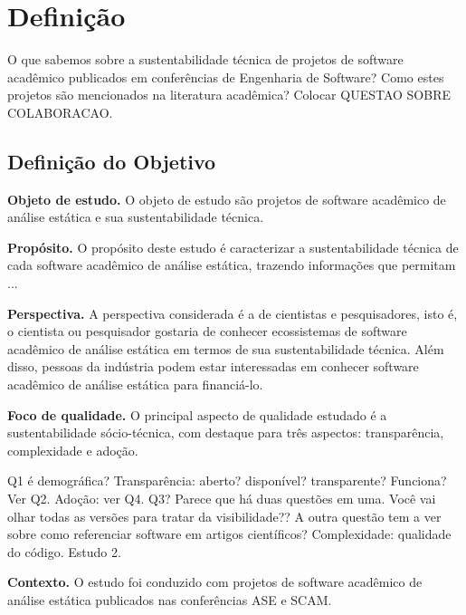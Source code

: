 

\section{Definição} \label{sec:study1:definition}


O que sabemos sobre a sustentabilidade técnica de projetos de software acadêmico publicados em conferências
de Engenharia de Software? Como estes projetos são mencionados na literatura acadêmica?   
Colocar QUESTAO SOBRE COLABORACAO.


\subsection{Definição do Objetivo}

\begin{description}
\item{\bf Objeto de estudo.} 
O objeto de estudo são projetos de software acadêmico de análise estática e sua sustentabilidade técnica.

\item{\bf Propósito.} 
O propósito deste estudo é caracterizar a sustentabilidade técnica de cada software acadêmico de análise estática,
trazendo informações que permitam ...

\item{\bf Perspectiva.} 
A perspectiva considerada é a de cientistas e pesquisadores, isto é, 
o cientista ou pesquisador gostaria de conhecer ecossistemas de software acadêmico de análise estática
em termos de sua sustentabilidade técnica. 
Além disso, pessoas da indústria podem estar interessadas em conhecer
software acadêmico de análise estática para financiá-lo.

\item{\bf Foco de qualidade.} 
O principal aspecto de qualidade estudado é a sustentabilidade sócio-técnica,
com destaque para três aspectos: transparência, complexidade e adoção.


Q1 é demográfica?
Transparência: aberto? disponível? transparente?  Funciona? Ver Q2.
Adoção: ver Q4.
Q3? Parece que há duas questões em uma. Você vai olhar todas as versões para tratar da visibilidade??
A outra questão tem a ver sobre como referenciar software em artigos científicos?
Complexidade: qualidade do código.  Estudo 2.

\item{\bf Contexto.} 
O estudo foi conduzido com projetos de software acadêmico de análise estática
publicados nas conferências ASE e SCAM.
\end{description}

